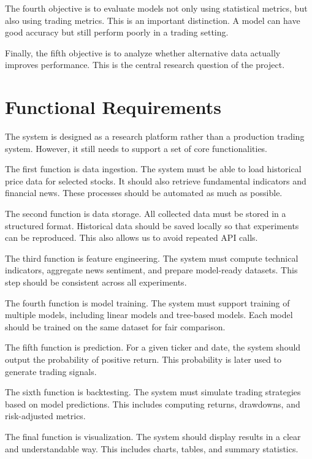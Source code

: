 \documentclass[12pt,a4paper]{article}
\begin{document}
The fourth objective is to evaluate models not only using statistical metrics, but also using trading metrics. This is an important distinction. A model can have good accuracy but still perform poorly in a trading setting.

Finally, the fifth objective is to analyze whether alternative data actually improves performance. This is the central research question of the project.

\section{Functional Requirements}

The system is designed as a research platform rather than a production trading system. However, it still needs to support a set of core functionalities.

The first function is data ingestion. The system must be able to load historical price data for selected stocks. It should also retrieve fundamental indicators and financial news. These processes should be automated as much as possible.

The second function is data storage. All collected data must be stored in a structured format. Historical data should be saved locally so that experiments can be reproduced. This also allows us to avoid repeated API calls.

The third function is feature engineering. The system must compute technical indicators, aggregate news sentiment, and prepare model-ready datasets. This step should be consistent across all experiments.

The fourth function is model training. The system must support training of multiple models, including linear models and tree-based models. Each model should be trained on the same dataset for fair comparison.

The fifth function is prediction. For a given ticker and date, the system should output the probability of positive return. This probability is later used to generate trading signals.

The sixth function is backtesting. The system must simulate trading strategies based on model predictions. This includes computing returns, drawdowns, and risk-adjusted metrics.

The final function is visualization. The system should display results in a clear and understandable way. This includes charts, tables, and summary statistics.
\end{document}
